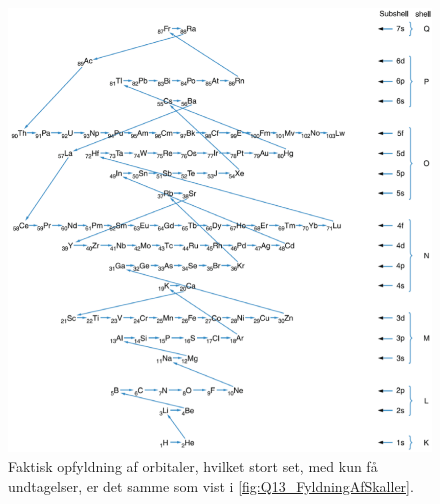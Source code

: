 \newpage

\begin{figure}[!h]
    \centering
    \includegraphics[width=\textwidth]{Q13/images/FyldningAfSkaller.PNG}
    \caption{Faktisk opfyldning af orbitaler, hvilket stort set, med kun få undtagelser, er det samme som vist i \cref{fig:Q13_FyldningAfSkaller}.}
    \label{fig:Q13_FyldningAfSkallerFaktisk}
\end{figure}